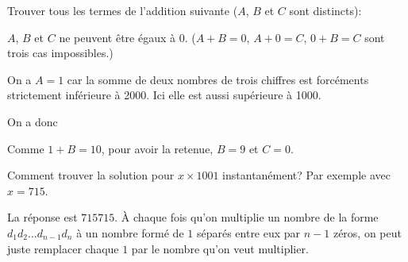 \documentclass[fleqn,a4paper,nobib]{tufte-handout}
\begin{document}
\begin{exercise}
    Trouver tous les termes de l'addition suivante
    ($A$, $B$ et $C$ sont distincts):

\end{exercise}

\begin{solution}
    $A$, $B$ et $C$ ne peuvent être égaux à $0$.
    ($A + B = 0$, $A + 0 = C$, $0 + B = C$ sont
    trois cas impossibles.)

    On a $A = 1$ car la somme de deux nombres de trois chiffres
    est forcéments strictement inférieure à 2000. Ici elle est
    aussi supérieure à 1000.

    On a donc



    Comme $1 + B = 10$, pour avoir la retenue, $B = 9$ et $C = 0$.

\end{solution}





\begin{exercise}
    Comment trouver la solution pour \(x \times 1001\)
    instantanément? Par exemple avec \(x = 715\).
\end{exercise}

\begin{solution}
    La réponse est $715715$. À chaque fois qu'on multiplie
    un nombre de la forme $d_1d_2\dots d_{n-1}d_n$ à
    un nombre formé de $1$ séparés entre eux par $n-1$ zéros,
    on peut juste remplacer chaque $1$ par le nombre qu'on
    veut multiplier.
\end{solution}
\end{document}
